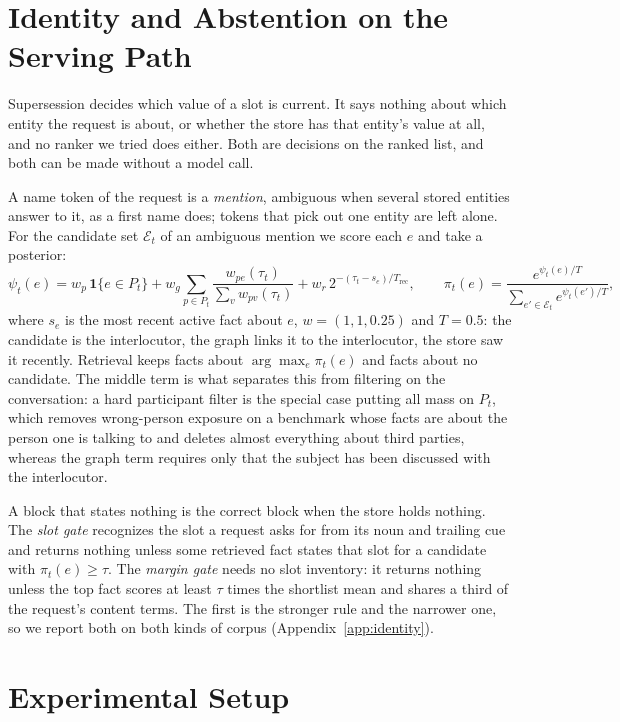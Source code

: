 \documentclass{article} %
\begin{document}
\section{Identity and Abstention on the Serving Path}
\label{sec:identity}

Supersession decides which value of a slot is current. It says nothing about which entity the request is about, or whether the store has that entity's value at all, and no ranker we tried does either. Both are decisions on the ranked list, and both can be made without a model call.

A name token of the request is a \emph{mention}, ambiguous when several stored entities answer to it, as a first name does; tokens that pick out one entity are left alone. For the candidate set $\mathcal{E}_t$ of an ambiguous mention we score each $e$ and take a posterior:
\begin{equation}
\psi_t(e)=w_p\,\mathbf{1}\{e\in P_t\}+w_g\!\!\sum_{p\in P_t}\!\frac{w_{pe}(\tau_t)}{\sum_v w_{pv}(\tau_t)}+w_r\,2^{-(\tau_t-s_e)/T_{\mathrm{rec}}},
\qquad
\pi_t(e)=\frac{e^{\psi_t(e)/T}}{\sum_{e'\in\mathcal{E}_t}e^{\psi_t(e')/T}},
\label{eq:identity}
\end{equation}
where $s_e$ is the most recent active fact about $e$, $w=(1,1,0.25)$ and $T=0.5$: the candidate is the interlocutor, the graph links it to the interlocutor, the store saw it recently. Retrieval keeps facts about $\arg\max_e\pi_t(e)$ and facts about no candidate. The middle term is what separates this from filtering on the conversation: a hard participant filter is the special case putting all mass on $P_t$, which removes wrong-person exposure on a benchmark whose facts are about the person one is talking to and deletes almost everything about third parties, whereas the graph term requires only that the subject has been discussed with the interlocutor.

A block that states nothing is the correct block when the store holds nothing. The \emph{slot gate} recognizes the slot a request asks for from its noun and trailing cue and returns nothing unless some retrieved fact states that slot for a candidate with $\pi_t(e)\ge\tau$. The \emph{margin gate} needs no slot inventory: it returns nothing unless the top fact scores at least $\tau$ times the shortlist mean and shares a third of the request's content terms. The first is the stronger rule and the narrower one, so we report both on both kinds of corpus (Appendix~\ref{app:identity}).

\section{Experimental Setup}
\label{sec:setup}
\end{document}

